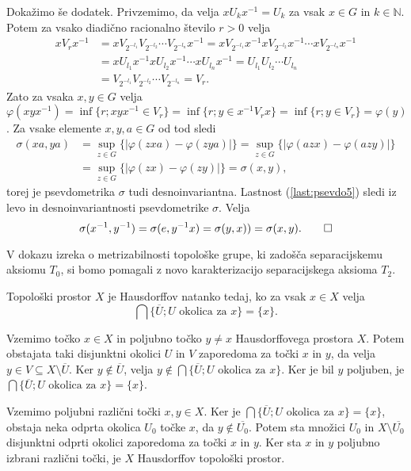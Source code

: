 \documentclass[mat1]{fmfdelo}
\newcommand{\N}{\mathbb N}
\newcommand{\closure}[1]{\overline{#1}}
\begin{document}
\begin{dokaz}
Dokažimo še dodatek. Privzemimo, da velja $xU_kx^{-1} = U_k$ za vsak $x \in G$ in $k \in \N$. Potem za vsako diadično racionalno število $r > 0$ velja
\begin{align*}
xV_rx^{-1} &= xV_{2^{-l_1}}V_{2^{-l_2}}\cdots V_{2^{-l_n}}x^{-1} = xV_{2^{-l_1}}x^{-1}xV_{2^{-l_2}}x^{-1}\cdots xV_{2^{-l_n}}x^{-1} \\
&= xU_{l_1}x^{-1}xU_{l_2}x^{-1}\cdots xU_{l_n}x^{-1} = U_{l_1}U_{l_2}\cdots U_{l_n} \\ 
&= V_{2^{-l_1}}V_{2^{-l_2}}\cdots V_{2^{-l_n}} = V_r.
\end{align*}
Zato za vsaka $x, y \in G$ velja $\varphi(xyx^{-1}) = \inf\lbrace r ; xyx^{-1} \in V_r \rbrace = \inf\lbrace r ; y \in x^{-1}V_rx \rbrace = \inf\lbrace r ; y \in V_r \rbrace = \varphi(y)$.
Za vsake elemente $x, y, a \in G$ od tod sledi
\begin{align*}
\sigma(xa, ya) &= \sup_{z \in G}\lbrace |\varphi(zxa) - \varphi(zya)| \rbrace = \sup_{z \in G}\lbrace |\varphi(azx) - \varphi(azy)| \rbrace \\
&= \sup_{z \in G}\lbrace |\varphi(zx) - \varphi(zy)| \rbrace = \sigma(x, y),
\end{align*}
torej je psevdometrika $\sigma$ tudi desnoinvariantna.
Lastnost (\ref{last:psevdo5}) sledi iz levo in desnoinvariantnosti psevdometrike $\sigma$. Velja
\[ \sigma(x^{-1}, y^{-1}) = \sigma(e, y^{-1}x) = \sigma(y, x) ) = \sigma(x, y). \qedhere\]
\end{dokaz}

V dokazu izreka o metrizabilnosti topološke grupe, ki zadošča separacijskemu aksiomu $T_0$, si bomo pomagali z novo karakterizacijo separacijskega aksioma $T_2$.
\begin{trditev}\label{trd:hauskar}
Topološki prostor $X$ je Hausdorffov natanko tedaj, ko za vsak $x \in X$ velja
\[ \bigcap\lbrace \closure{U} ; U \text{ okolica za } x \rbrace = \lbrace x \rbrace. \]
\end{trditev}

\begin{dokaz}
Vzemimo točko $x \in X$ in poljubno točko $y \neq x$ Hausdorffovega prostora $X$. Potem obstajata taki disjunktni okolici $U$ in $V$ zaporedoma za točki $x$ in $y$, da velja $y \in V \subseteq X\setminus \closure{U}$. Ker $y \notin \closure{U}$, velja $y \notin \bigcap\lbrace \closure{U} ; U \text{ okolica za } x \rbrace$. Ker je bil $y$ poljuben, je $\bigcap\lbrace \closure{U} ; U \text{ okolica za } x \rbrace = \lbrace x \rbrace$.

Vzemimo poljubni različni točki $x, y \in X$. Ker je $\bigcap\lbrace \closure{U} ; U \text{ okolica za } x \rbrace = \lbrace x \rbrace$, obstaja neka odprta okolica $U_0$ točke $x$, da $y \notin \closure{U_0}$. Potem sta množici $U_0$ in $X \setminus \closure{U_0}$ disjunktni odprti okolici zaporedoma za točki $x$ in $y$. Ker sta $x$ in $y$ poljubno izbrani različni točki, je $X$ Hausdorffov topološki prostor.
\end{dokaz}
\end{document}
